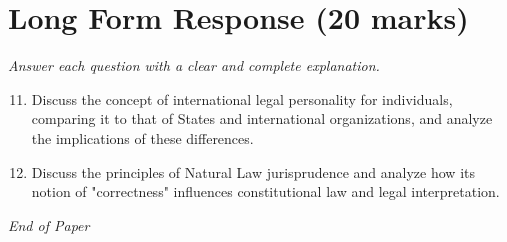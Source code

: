 \documentclass[12pt]{article}
\begin{document}
\section*{Long Form Response (20 marks)}
\textit{Answer each question with a clear and complete explanation.}
\begin{enumerate}[label=\arabic*.]
\setcounter{enumi}{10}
\item Discuss the concept of international legal personality for individuals, comparing it to that of States and international organizations, and analyze the implications of these differences.
\item Discuss the principles of Natural Law jurisprudence and analyze how its notion of "correctness" influences constitutional law and legal interpretation.
\end{enumerate}

\vfill
\noindent\textit{End of Paper}
\end{document}
